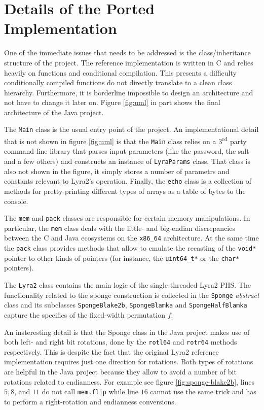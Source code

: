 \chapter{Details of the Ported Implementation}

One of the immediate issues that needs to be addressed is the class/inheritance structure of the project. The reference implementation is written in C and relies heavily on functions and conditional compilation. This presents a difficulty conditionally compiled functions do not directly translate to a clean class hierarchy. Furthermore, it is borderline impossible to design an architecture and not have to change it later on. Figure \ref{fig:uml} in part shows the final architecture of the Java project.

The \texttt{Main} class is the usual entry point of the project. An implementational detail that is not shown in figure \ref{fig:uml} is that the \texttt{Main} class relies on a 3\textsuperscript{rd} party command line library that parses input parameters (like the password, the salt and a few others) and constructs an instance of \texttt{LyraParams} class. That class is also not shown in the figure, it simply stores a number of parametrs and constants relevant to Lyra2's operation. Finally, the \texttt{echo} class is a collection of methods for pretty-printing different types of arrays as a table of bytes to the console.

The \texttt{mem} and \texttt{pack} classes are responsible for certain memory manipulations. In particular, the \texttt{mem} class deals with the little- and big-endian discrepancies between the C and Java ecosystems on the \texttt{x86\_64} architecture. At the same time the \texttt{pack} class provides methods that allow to emulate the recasting of the \texttt{void*} pointer to other kinds of pointers (for instance, the \texttt{uint64\_t*} or the \texttt{char*} pointers).

The \texttt{Lyra2} class contains the main logic of the single-threaded Lyra2 PHS. The functionality related to the sponge construction is collected in the \texttt{Sponge} \emph{abstract} class and its subclasses \texttt{SpongeBlake2b}, \texttt{SpongeBlamka} and \texttt{SpongeHalfBlamka} capture the specifics of the fixed-width permutation \(f\).

An insteresting detail is that the Sponge class in the Java project makes use of both left- and right bit rotations, done by the \texttt{rotl64} and \texttt{rotr64} methods respectively. This is despite the fact that the original Lyra2 reference implementation requires just one direction for rotations. Both types of rotations are helpful in the Java project because they allow to avoid a number of bit rotations related to endianness. For example see figure \ref{fig:sponge-blake2b}, lines \(5, 8\), and \(11\) do not call \texttt{mem.flip} while line \(16\) cannot use the same trick and has to perform a right-rotation and endianness conversions.


